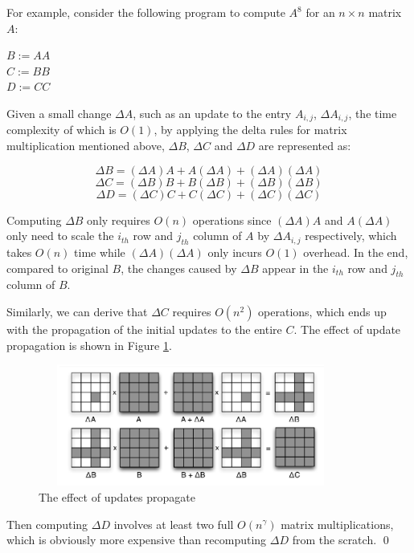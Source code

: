 \begin{example}\label{eg: incremental_naive_update}
For example, consider the following program to compute $A^8$ for an $n\times n$ matrix $A$:

\begin{center}
    $B:= AA$\\
    $C:= BB$\\
    $D:= CC$
\end{center}

Given a small change $\Delta A$, such as an update to the entry $A_{i,j}$, $\Delta A_{i,j}$, the time complexity of which is $O(1)$, by applying the delta rules for matrix multiplication mentioned above, $\Delta B$, $\Delta C$ and $\Delta D$ are represented as:

\begin{equation}\label{eq: delta_b}
    \Delta B = (\Delta A) A + A (\Delta A) + (\Delta A) (\Delta A)
\end{equation}
\begin{equation}\label{eq: delta_c}
    \Delta C = (\Delta B) B + B (\Delta B) + (\Delta B) (\Delta B)
\end{equation}
\begin{equation}\label{eq: delta_d}
    \Delta D = (\Delta C) C + C (\Delta C) + (\Delta C) (\Delta C)
\end{equation}
    


Computing $\Delta B$ only requires $O(n)$ operations since $(\Delta A) A$ and $A (\Delta A)$ only need to scale the $i_{th}$ row and $j_{th}$ column of $A$ by $\Delta A_{i,j}$ respectively, which takes $O(n)$ time while $(\Delta A) (\Delta A)$ only incurs $O(1)$ overhead. In the end, compared to original $B$, the changes caused by $\Delta B$ appear in the $i_{th}$ row and $j_{th}$ column of $B$.

Similarly, we can derive that $\Delta C$ requires $O(n^2)$ operations, which ends up with the propagation of the initial updates to the entire $C$. The effect of update propagation is shown in Figure \ref{fig:update_propagete}.

\begin{figure}
    \centering
    \includegraphics[width=10cm, height=4cm]{Figures/update_propagation.png}
    \caption{The effect of updates propagate}
    \label{fig:update_propagete}
\end{figure}

Then computing $\Delta D$ involves at least two full $O(n^{\gamma})$ matrix multiplications, which is obviously more expensive than recomputing $\Delta D$ from the scratch. \qed
\end{example}



